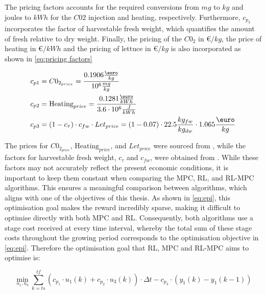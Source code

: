 The pricing factors accounts for the required conversions from $mg$ to $kg$ and joules to $kWh$ for the $C02$ injection and heating, respectively. Furthermore, $c_{p_3}$ incorporates the factor of harvestable fresh weight, which quantifies the amount of fresh relative to dry weight. Finally, the pricing of the $C0_2$ in \euro $/kg$, the price of heating in \euro$/kWh$ and the pricing of lettuce in \euro$/kg$ is also incorporated as shown in \autoref{eq:pricing factors}

\begin{equation}\label{eq:pricing factors}
	\begin{aligned}
		& c_{p1} = C0_{2_{price}}  =  \frac{0.1906 \frac{\text{\euro}}{kg}}{10^{6} \frac{mg}{kg}}\\
		& c_{p2} = \text{Heating}_{price} = \frac{0.1281 \frac{\text{\euro}}{kWh}}{3.6\cdot 10^{6} \frac{J}{kWh}}\\
		& c_{p3} = (1-c_{\tau})  \cdot c_{fw} \cdot Let_{price}= (1-0.07) \cdot 22.5 \frac{kg_{fw}}{kg_{dw}} \cdot 1.065 \frac{\text{\euro}}{kg} \\
	\end{aligned}
\end{equation}

The prices for $C0_{2_{price}}$, $\text{Heating}_{price}$, and $Let_{price}$ were sourced from \cite{vandenbemdRobustDeepReinforcement}, while the factors for harvestable fresh weight, $c_{\tau}$ and $c_{fw}$, were obtained from \cite{hentenGreenhouseClimateManagement1994}. While these factors may not accurately reflect the present economic conditions, it is important to keep them constant when comparing the MPC, RL, and RL-MPC algorithms. This ensures a meaningful comparison between algorithms, which aligns with one of the objectives of this thesis. As shown in \autoref{eq:epi}, this optimisation goal makes the reward incredibly sparse, making it difficult to optimise directly with both MPC and RL. Consequently, both algorithms use a stage cost received at every time interval, whereby the total sum of these stage costs throughout the growing period corresponds to the optimisation objective in \autoref{eq:epi}. Therefore the optimisation goal that RL, MPC and RL-MPC aims to optimise is:

\begin{equation}\label{eq:stage-cost-epi}
	\min_{u_1,u_3} \sum_{k = ts}^{tf} {(c_{p_1} \cdot u_1(k) + c_{p_2} \cdot u_3(k))\cdot \Delta t - c_{p_3} \cdot (y_1(k) - y_1(k-1)) }
\end{equation}


